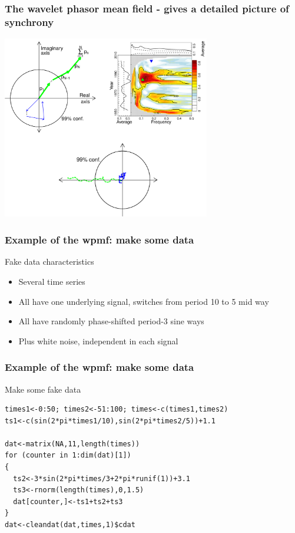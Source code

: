 \documentclass{beamer}
\begin{document}
\begin{frame}
  \frametitle{The wavelet phasor mean field - gives a detailed picture of synchrony}
  \begin{center}
    \includegraphics[height=8cm]{./figures/WPMF.png}
  \end{center}
\end{frame}

\begin{frame}[fragile]
\frametitle{Example of the wpmf: make some data}
\begin{block}{Fake data characteristics}
\begin{itemize}
\item Several time series
\item All have one underlying signal, switches from period 10 to 5 mid way
\item All have randomly phase-shifted period-3 sine ways
\item Plus white noise, independent in each signal
\end{itemize}
\end{block}
\end{frame}

\begin{frame}[fragile]
\frametitle{Example of the wpmf: make some data}
\begin{exampleblock}{Make some fake data}
\begin{verbatim}
times1<-0:50; times2<-51:100; times<-c(times1,times2)
ts1<-c(sin(2*pi*times1/10),sin(2*pi*times2/5))+1.1 

dat<-matrix(NA,11,length(times))
for (counter in 1:dim(dat)[1])
{
  ts2<-3*sin(2*pi*times/3+2*pi*runif(1))+3.1
  ts3<-rnorm(length(times),0,1.5)
  dat[counter,]<-ts1+ts2+ts3    
}
dat<-cleandat(dat,times,1)$cdat
\end{verbatim}
\end{exampleblock}
\end{frame}
\end{document}
